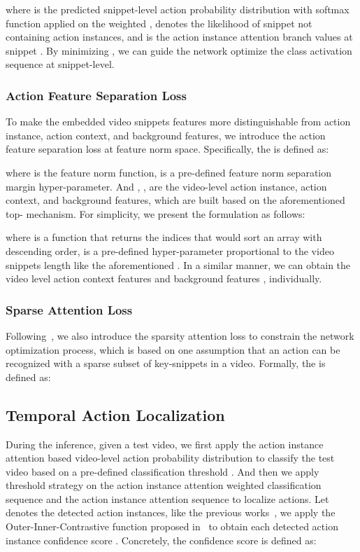\documentclass[journal,comsoc]{IEEEtran}
\begin{document}
where  is the predicted snippet-level action probability distribution with softmax function applied on the weighted ,  denotes the likelihood of snippet  not containing action instances, and  is the action instance attention branch values at snippet . By minimizing , we can guide the network optimize the class activation sequence at snippet-level.

\subsubsection{Action Feature Separation Loss}
\par To make the embedded video snippets features more distinguishable from action instance, action context, and background features, we introduce the action feature separation loss  at feature norm space. Specifically, the  is defined as:

where  is the feature norm function,  is a pre-defined feature norm separation margin hyper-parameter. And , ,  are the video-level action instance, action context, and background features, which are built based on the aforementioned top- mechanism. For simplicity, we present the  formulation as follows:

where  is a function that returns the indices that would sort an array with descending order,  is a pre-defined hyper-parameter proportional to the video snippets length  like the aforementioned . In a similar manner, we can obtain the video level action context features  and background features , individually.

\subsubsection{Sparse Attention Loss}
\par Following~\cite{STPN, WTALC, ACSNET}, we also introduce the sparsity attention loss  to constrain the network optimization process, which is based on one assumption that an action can be recognized with a sparse subset of key-snippets in a video. Formally, the  is defined as:


\subsection{Temporal Action Localization}
\par During the inference, given a test video, we first apply the action instance attention based video-level action probability distribution  to classify the test video based on a pre-defined classification threshold . And then we apply threshold strategy on the action instance attention weighted classification sequence  and the action instance attention sequence  to localize actions. Let  denotes the detected action instances, like the previous works~\cite{BASNet, A2CLPT, ACSNET}, we apply the Outer-Inner-Contrastive function proposed in~\cite{AUTOLOC} to obtain each detected action instance confidence score . Concretely, the confidence score is defined as:
\end{document}
